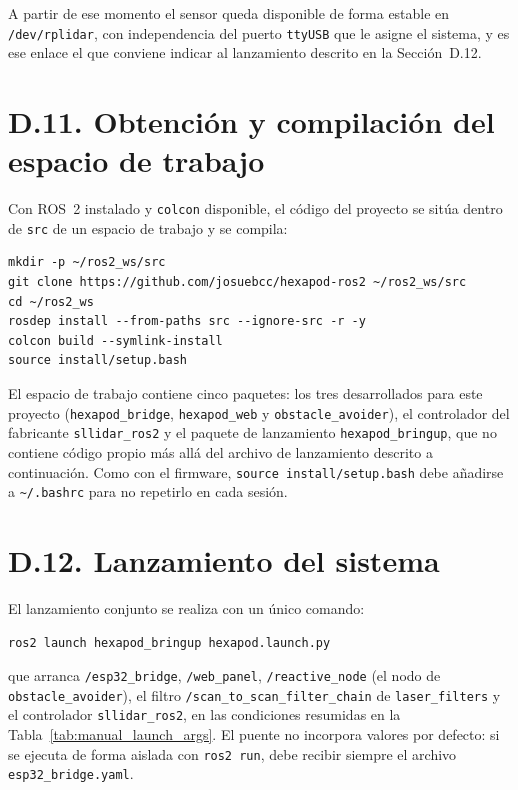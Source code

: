 A partir de ese momento el sensor queda disponible de forma estable en
\texttt{/dev/rplidar}, con independencia del puerto \texttt{ttyUSB} que le
asigne el sistema, y es ese enlace el que conviene indicar al lanzamiento
descrito en la Sección~D.12.

\section*{D.11. Obtención y compilación del espacio de trabajo}

Con ROS~2 instalado y \texttt{colcon} disponible, el código del proyecto
\cite{repositorio_hexapodo} se sitúa dentro de \texttt{src} de un espacio de
trabajo y se compila:

\begin{lstlisting}[basicstyle=\ttfamily\small,frame=single,breaklines=true]
mkdir -p ~/ros2_ws/src
git clone https://github.com/josuebcc/hexapod-ros2 ~/ros2_ws/src
cd ~/ros2_ws
rosdep install --from-paths src --ignore-src -r -y
colcon build --symlink-install
source install/setup.bash
\end{lstlisting}

El espacio de trabajo contiene cinco paquetes: los tres desarrollados para
este proyecto (\texttt{hexapod\_bridge}, \texttt{hexapod\_web} y
\texttt{obstacle\_avoider}), el controlador del fabricante \texttt{sllidar\_ros2}
\cite{sllidar_ros2} y el paquete de lanzamiento \texttt{hexapod\_bringup}, que
no contiene código propio más allá del archivo de lanzamiento descrito a
continuación. Como con el firmware, \texttt{source install/setup.bash} debe
añadirse a \texttt{\textasciitilde/.bashrc} para no repetirlo en cada sesión.

\section*{D.12. Lanzamiento del sistema}

El lanzamiento conjunto se realiza con un único comando:

\begin{lstlisting}[basicstyle=\ttfamily\small,frame=single]
ros2 launch hexapod_bringup hexapod.launch.py
\end{lstlisting}

que arranca \texttt{/esp32\_bridge}, \texttt{/web\_panel}, \texttt{/reactive\_node}
(el nodo de \texttt{obstacle\_avoider}), el filtro
\texttt{/scan\_to\_scan\_filter\_chain} de \texttt{laser\_filters} y el controlador
\texttt{sllidar\_ros2}, en las condiciones resumidas en la
Tabla~\ref{tab:manual_launch_args}. El puente no
incorpora valores por defecto: si se ejecuta de forma aislada con
\texttt{ros2 run}, debe recibir siempre el archivo \texttt{esp32\_bridge.yaml}.

